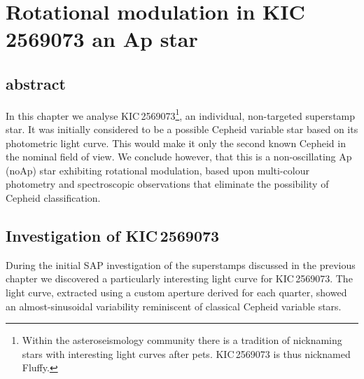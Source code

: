 \chapter{Rotational modulation in KIC\,2569073 an Ap star}

\section*{abstract}
    In this chapter we analyse KIC\,2569073\footnote[2]{Within the asteroseismology community there is a tradition of nicknaming stars with interesting light curves after pets. KIC\,2569073 is thus nicknamed Fluffy.}, an individual, non-targeted \Kepler superstamp star. It was initially considered to be a possible Cepheid variable star based on its photometric light curve. This would make it only the second known Cepheid in the nominal \Kepler field of view. We conclude however, that this is a non-oscillating Ap (noAp) star exhibiting rotational modulation, based upon multi-colour photometry and spectroscopic observations that eliminate the possibility of Cepheid classification.
\newpage
\section{Investigation of KIC\,2569073}


During the initial SAP investigation of the \Kepler superstamps discussed in the previous chapter we discovered a particularly interesting light curve for KIC\,2569073. The light curve, extracted using a custom aperture derived for each quarter, showed an almost-sinusoidal variability reminiscent of classical Cepheid variable stars. 


